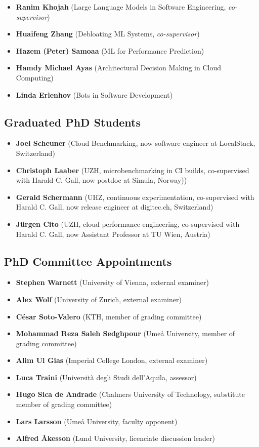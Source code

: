 \documentclass[paper=letter,fontsize=11pt]{scrartcl} %
\begin{document}
\begin{itemize}
\item \textbf{Ranim Khojah} (Large Language Models in Software Engineering, \emph{co-supervisor})
\item \textbf{Huaifeng Zhang}  (Debloating ML Systems, \emph{co-supervisor})  
\item \textbf{Hazem (Peter) Samoaa}  (ML for Performance Prediction)
\item \textbf{Hamdy Michael Ayas}  (Architectural Decision Making in Cloud Computing)
\item \textbf{Linda Erlenhov}  (Bots in Software Development)
\end{itemize}

\subsection*{Graduated PhD Students}

\begin{itemize}
\item \textbf{Joel Scheuner}  (Cloud Benchmarking, now software engineer at LocalStack, Switzerland)
\item \textbf{Christoph Laaber} (UZH, microbenchmarking in CI builds, co-supervised with Harald C. Gall, now postdoc at Simula, Norway))
\item \textbf{Gerald Schermann} (UHZ, continuous experimentation, co-supervised with Harald C. Gall, now release engineer at digitec.ch, Switzerland)
\item \textbf{J\"urgen Cito} (UZH, cloud performance engineering, co-supervised with Harald C. Gall, now Assistant Professor at TU Wien, Austria)
\end{itemize}

\subsection*{PhD Committee Appointments}

\begin{itemize}
\item \textbf{Stephen Warnett} (University of Vienna, external examiner)
\item \textbf{Alex Wolf} (University of Zurich, external examiner)
\item \textbf{César Soto-Valero} (KTH, member of grading committee)
\item \textbf{Mohammad Reza Saleh Sedghpour} (Umeå University, member of grading committee)
\item \textbf{Alim Ul Gias} (Imperial College London, external examiner) 
\item \textbf{Luca Traini} (Università degli Studi dell'Aquila, assessor) 
\item \textbf{Hugo Sica de Andrade} (Chalmers University of Technology, substitute member of grading committee) 
\item \textbf{Lars Larsson} (Umeå University, faculty opponent)
\item \textbf{Alfred Åkesson} (Lund University, licenciate discussion leader)
\end{itemize}
\end{document}
